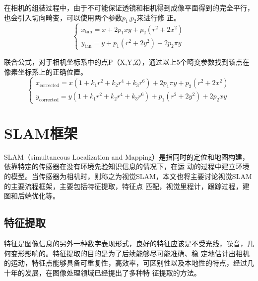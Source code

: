 在相机的组装过程中，由于不可能保证透镜和相机得到成像平面得到的完全平行，也会引入切向畸变，可以使用两个参数$p_1$,$p_2$来进行修
正。
\begin{equation}
  \left\{\begin{array}{l}{x_{\tan }=x+2 p_{1} x y+p_{2}\left(r^{2}+2 x^{2}\right)} \\ {y_{\tan }=y+p_{1}\left(r^{2}+2 y^{2}\right)+2 p_{2} \pi y}\end{array}\right.
\end{equation}

联合公式，对于相机坐标系中的点P（X,Y,Z），通过以上5个畸变参数找到该点在像素坐标系上的正确位置。
\begin{equation}
  \left\{\begin{array}{l}{x_{\text {corrected}}=x\left(1+k_{1} r^{2}+k_{2} r^{4}+k_{3} r^{6}\right)+2 p_{1} \pi y+p_{2}\left(r^{2}+2 x^{2}\right)} \\ {y_{\text {corrected}}=y\left(1+k_{1} r^{2}+k_{2} r^{4}+k_{3} r^{6}\right)+p_{1}\left(r^{2}+2 y^{2}\right)+2 p_{2} x y}\end{array}\right.
\end{equation}


\section{SLAM框架}
SLAM（simultaneous Localization and Mapping）是指同时的定位和地图构建，依靠特定的传感器在没有环境先验知识信息的情况下，在运
动的过程中建立环境的模型。当传感器为相机时，则称之为视觉SLAM，本文也将主要讨论视觉SLAM的主要流程框架，主要包括特征提取，特征点
匹配，视觉里程计，跟踪过程，建图和后端优化等。
\subsection{特征提取}
特征是图像信息的另外一种数字表现形式，良好的特征应该是不受光线，噪音，几何变形影响的。特征提取的目的是为了后续能够尽可能准确、稳
定地估计出相机的运动，特征点能够具备可重复性，高效率，可区别性以及本地性的特点，经过几十年的发展，在图像处理领域已经提出了多种特
征提取的方法。

